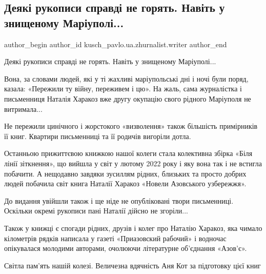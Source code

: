  
 
 
 
 

\subsection{Деякі рукописи справді не горять. Навіть у знищеному Маріуполі...}
\label{sec:21_01_2023.fb.kusch_pavlo.ua.zhurnalist.writer.1.deyak__rukopisi_spra}

\ifcmt
 author_begin
   author_id kusch_pavlo.ua.zhurnalist.writer
 author_end
\fi

Деякі рукописи справді не горять. Навіть у знищеному Маріуполі...

Вона, за словами людей, які у ті жахливі маріупольські дні і ночі були поряд,
казала: «Пережили ту війну, переживем і цю». На жаль, сама журналістка і
письменниця Наталія Харакоз вже другу окупацію свого рідного Маріуполя не
витримала...

Не пережили цинічного і жорстокого «визволення» також більшість примірників її
книг. Квартири письменниці та її родичів  вигоріли дотла. 

Останньою прижиттєвою книжкою нашої колеги стала колективна збірка «Біля лінії
зіткнення», що вийшла у світ у лютому 2022 року і яку вона так і не встигла
побачити. А нещодавно завдяки зусиллям рідних, близьких та просто добрих людей
побачила світ книга Наталії Харакоз «Новели Азовського узбережжя». 

До видання увійшли також і ще ніде не опубліковані твори письменниці. Оскільки
окремі рукописи пані Наталії дійсно не згоріли... 

Також у книжці є спогади рідних, друзів і колег про Наталію Харакоз, яка чимало
кілометрів рядків написала у газеті «Приазовский рабочий» і водночас
опікувалася молодими авторами, очолюючи літературне об'єднання «Азов'є». 

Світла пам'ять нашій колезі. Величезна вдячність Аня Кот за підготовку цієї
книг

